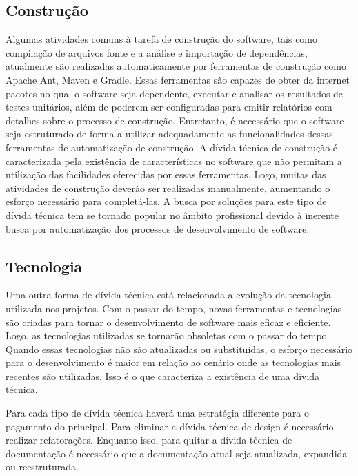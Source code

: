 \subsection{Construção}
Algumas atividades comuns à tarefa de construção do software, tais como compilação de arquivos fonte e a análise e importação de dependências, atualmente são realizadas automaticamente por ferramentas de construção como Apache Ant\cite{de2015learning}, Maven\cite{goldman2007maven} e Gradle\cite{muschko2014gradle}. Essas ferramentas são capazes de obter da internet pacotes no qual o software seja dependente, executar e analisar os resultados de testes unitários, além de poderem ser configuradas para emitir relatórios com detalhes sobre o processo de construção.  Entretanto, é necessário que o software seja estruturado de forma a utilizar adequadamente as funcionalidades dessas ferramentas de automatização de construção. A dívida técnica de construção é caracterizada pela existência de características no software que não permitam a utilização das facilidades oferecidas por essas ferramentas. Logo, muitas das atividades de construção deverão ser realizadas manualmente, aumentando o esforço necessário para completá-las.  A busca por soluções para este tipo de dívida técnica tem se tornado popular no âmbito profissional devido à inerente busca por automatização dos processos de desenvolvimento de software\cite{morgenthaler2012searching}.

\subsection{Tecnologia}
\label{tipo_td_tecnologia}

Uma outra forma de dívida técnica está relacionada a evolução da tecnologia utilizada nos projetos.  Com o passar do tempo, novas ferramentas e tecnologias são criadas para tornar o desenvolvimento de software mais eficaz e eficiente. Logo, as tecnologias utilizadas se tornarão obsoletas com o passar do tempo. Quando essas tecnologias não são atualizadas ou substituídas, o esforço necessário para o desenvolvimento é maior em relação ao cenário onde as tecnologias mais recentes são utilizadas. Isso é o que caracteriza a existência de uma dívida técnica.

Para cada tipo de dívida técnica haverá uma estratégia diferente para o pagamento do principal. Para eliminar a dívida técnica de design é necessário realizar refatorações. Enquanto isso, para quitar a dívida técnica de documentação é necessário que a documentação atual seja atualizada, expandida ou reestruturada. 





